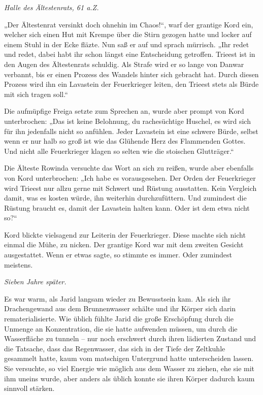 
\textit{Halle des Ältestenrats, 61 a.Z.}\bigskip



„Der Ältestenrat versinkt doch ohnehin im Chaos!“, warf der grantige Kord ein, welcher sich einen Hut mit Krempe über die Stirn gezogen hatte und locker auf einem Stuhl in der Ecke fläzte. Nun saß er auf und sprach mürrisch. „Ihr redet und redet, dabei habt ihr schon längst eine Entscheidung getroffen. Trieest ist in den Augen des Ältestenrats schuldig. Als Strafe wird er so lange von Danwar verbannt, bis er einen Prozess des Wandels hinter sich gebracht hat. Durch diesen Prozess wird ihn ein Lavastein der Feuerkrieger leiten, den Trieest stets als Bürde mit sich tragen soll.“

Die aufmüpfige Freiga setzte zum Sprechen an, wurde aber prompt von Kord unterbrochen: „Das ist keine Belohnung, du rachesüchtige Huschel, es wird sich für ihn jedenfalls nicht so anfühlen. Jeder Lavastein ist eine schwere Bürde, selbst wenn er nur halb so groß ist wie das Glühende Herz des Flammenden Gottes. Und nicht alle Feuerkrieger klagen so selten wie die stoischen Glutträger.“

Die Älteste Rowinda versuchte das Wort an sich zu reißen, wurde aber ebenfalls von Kord unterbrochen: „Ich habe es vorausgesehen. Der Orden der Feuerkrieger wird Trieest nur allzu gerne mit Schwert und Rüstung ausstatten. Kein Vergleich damit, was es kosten würde, ihn weiterhin durchzufüttern. Und zumindest die Rüstung braucht es, damit der Lavastein halten kann. Oder ist dem etwa nicht so?“

Kord blickte vielsagend zur Leiterin der Feuerkrieger. Diese machte sich nicht einmal die Mühe, zu nicken. Der grantige Kord war mit dem zweiten Gesicht ausgestattet. Wenn er etwas sagte, so stimmte es immer. Oder zumindest meistens.\bigskip








\textit{Sieben Jahre später.}\bigskip




Es war warm, als Jarid langsam wieder zu Bewusstsein kam. Als sich ihr Drachengewand aus dem Brunnenwasser schälte und ihr Körper sich darin rematerialisierte. Wie üblich fühlte Jarid die große Erschöpfung durch die Unmenge an Konzentration, die sie hatte aufwenden müssen, um durch die Wasserfläche zu tunneln – nur noch erschwert durch ihren lädierten Zustand und die Tatsache, dass das Regenwasser, das sich in der Tiefe der Zeltkuhle gesammelt hatte, kaum vom matschigen Untergrund hatte unterscheiden lassen. Sie versuchte, so viel Energie wie möglich aus dem Wasser zu ziehen, ehe sie mit ihm uneins wurde, aber anders als üblich konnte sie ihren Körper dadurch kaum sinnvoll stärken.

